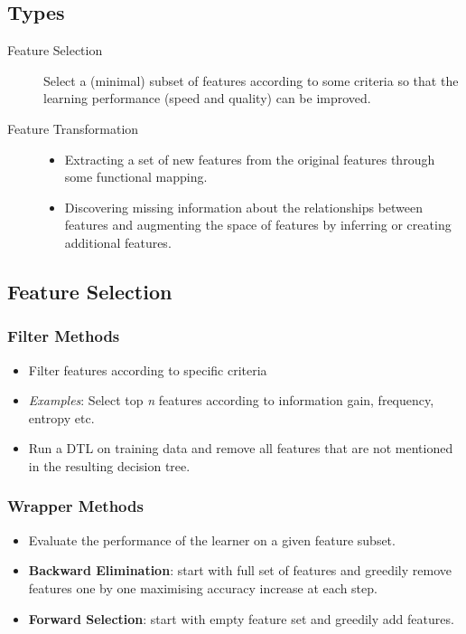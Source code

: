 \documentclass[11pt]{article}
\begin{document}
\subsection{Types}
\label{sec:orgda73559}
\begin{description}
\item[{Feature Selection}] Select a (minimal) subset of features according to some criteria so that the learning performance (speed and quality) can be improved.
\item[{Feature Transformation}] \begin{itemize}
\item Extracting a set of new features from the original features through some functional mapping.
\item Discovering missing information about the relationships between features and augmenting the space of features by inferring or creating additional features.
\end{itemize}
\end{description}

\subsection{Feature Selection}
\label{sec:org21bd9e8}
\subsubsection{Filter Methods}
\label{sec:org1252635}
\begin{itemize}
\item Filter features according to specific criteria
\item \emph{Examples}: Select top \emph{n} features according to information gain, frequency, entropy etc.
\item Run a DTL on training data and remove all features that are not mentioned in the resulting decision tree.
\end{itemize}
\subsubsection{Wrapper Methods}
\label{sec:org1a56c39}
\begin{itemize}
\item Evaluate the performance of the learner on a given feature subset.
\item \textbf{Backward Elimination}: start with full set of features and greedily remove features one by one maximising accuracy increase at each step.
\item \textbf{Forward Selection}: start with empty feature set and greedily add features.
\end{itemize}
\end{document}
